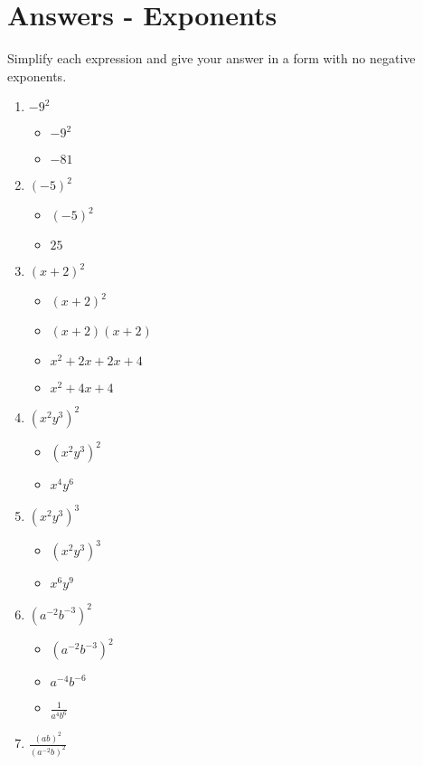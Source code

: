 \documentclass{article}
\begin{document}
\newpage
\section{Answers - Exponents}
Simplify each expression and give your answer in a form with no negative exponents.
\begin{enumerate}
\item $-9^{2}$
  \begin{itemize}
  \item $-9^{2}$
  \item $-81$
  \end{itemize}
\item $(-5)^{2}$
  \begin{itemize}
  \item $(-5)^{2}$
  \item $25$
  \end{itemize}
\item $(x+2)^{2}$
  \begin{itemize}
  \item $(x+2)^{2}$
  \item $(x+2)(x+2)$
  \item $x^{2}+2x+2x+4$
  \item $x^{2}+4x+4$
  \end{itemize}
\item $(x^{2}y^{3})^{2}$
  \begin{itemize}
  \item $(x^{2}y^{3})^{2}$
  \item $x^{4}y^{6}$
  \end{itemize}
\item $(x^{2}y^{3})^{3}$
  \begin{itemize}
  \item $(x^{2}y^{3})^{3}$
  \item $x^{6}y^{9}$
  \end{itemize}
\item $(a^{-2}b^{-3})^{2}$
  \begin{itemize}
  \item $(a^{-2}b^{-3})^{2}$
  \item $a^{-4}b^{-6}$
  \item {\Large $\frac{1}{a^{4}b^{6}}$}
  \end{itemize}
\item {\Large $\frac{(ab)^{2}}{(a^{-2}b)^{2}}$}

\end{enumerate}
\end{document}
